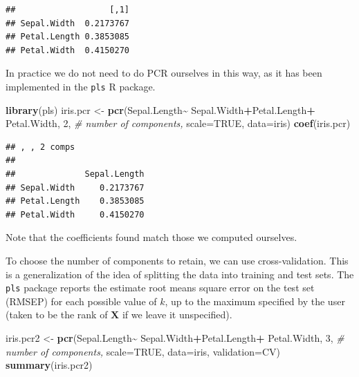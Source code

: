 \documentclass[
]{book}
\newenvironment{Shaded}{\begin{snugshade}}{\end{snugshade}}
\newcommand{\AttributeTok}[1]{\textcolor[rgb]{0.13,0.29,0.53}{#1}}
\newcommand{\CommentTok}[1]{\textcolor[rgb]{0.56,0.35,0.01}{\textit{#1}}}
\newcommand{\ConstantTok}[1]{\textcolor[rgb]{0.56,0.35,0.01}{#1}}
\newcommand{\DecValTok}[1]{\textcolor[rgb]{0.00,0.00,0.81}{#1}}
\newcommand{\FunctionTok}[1]{\textcolor[rgb]{0.13,0.29,0.53}{\textbf{#1}}}
\newcommand{\NormalTok}[1]{#1}
\newcommand{\OtherTok}[1]{\textcolor[rgb]{0.56,0.35,0.01}{#1}}
\newcommand{\SpecialCharTok}[1]{\textcolor[rgb]{0.81,0.36,0.00}{\textbf{#1}}}
\newcommand{\StringTok}[1]{\textcolor[rgb]{0.31,0.60,0.02}{#1}}
\theoremstyle{definition}
\theoremstyle{definition}
\theoremstyle{definition}
\theoremstyle{definition}
\theoremstyle{remark}
\begin{document}
\begin{verbatim}
##                   [,1]
## Sepal.Width  0.2173767
## Petal.Length 0.3853085
## Petal.Width  0.4150270
\end{verbatim}

In practice we do not need to do PCR ourselves in this way, as it has been implemented in the \texttt{pls} R package.

\begin{Shaded}
\begin{Highlighting}[]
\FunctionTok{library}\NormalTok{(pls)}
\NormalTok{iris.pcr }\OtherTok{\textless{}{-}} \FunctionTok{pcr}\NormalTok{(Sepal.Length}\SpecialCharTok{\textasciitilde{}}\NormalTok{ Sepal.Width}\SpecialCharTok{+}\NormalTok{Petal.Length}\SpecialCharTok{+}
\NormalTok{                  Petal.Width, }\DecValTok{2}\NormalTok{, }\CommentTok{\# number of components,}
                \AttributeTok{scale=}\ConstantTok{TRUE}\NormalTok{, }\AttributeTok{data=}\NormalTok{iris)}
\FunctionTok{coef}\NormalTok{(iris.pcr)}
\end{Highlighting}
\end{Shaded}

\begin{verbatim}
## , , 2 comps
## 
##              Sepal.Length
## Sepal.Width     0.2173767
## Petal.Length    0.3853085
## Petal.Width     0.4150270
\end{verbatim}

Note that the coefficients found match those we computed ourselves.

To choose the number of components to retain, we can use cross-validation. This is a generalization of the idea of splitting the data into training and test sets. The \texttt{pls} package reports the estimate root means square error on the test set (RMSEP) for each possible value of \(k\), up to the maximum specified by the user (taken to be the rank of \(\mathbf X\) if we leave it unspecified).

\begin{Shaded}
\begin{Highlighting}[]
\NormalTok{iris.pcr2 }\OtherTok{\textless{}{-}} \FunctionTok{pcr}\NormalTok{(Sepal.Length}\SpecialCharTok{\textasciitilde{}}\NormalTok{ Sepal.Width}\SpecialCharTok{+}\NormalTok{Petal.Length}\SpecialCharTok{+}
\NormalTok{                   Petal.Width, }\DecValTok{3}\NormalTok{, }\CommentTok{\# number of components,}
                \AttributeTok{scale=}\ConstantTok{TRUE}\NormalTok{, }\AttributeTok{data=}\NormalTok{iris, }\AttributeTok{validation=}\StringTok{\textquotesingle{}CV\textquotesingle{}}\NormalTok{)}
\FunctionTok{summary}\NormalTok{(iris.pcr2)}
\end{Highlighting}
\end{Shaded}
\end{document}
